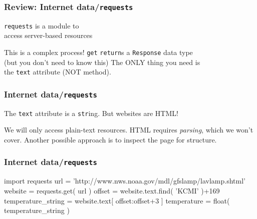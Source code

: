 \documentclass[11pt]{beamer}
\begin{document}
\begin{frame}[fragile]
  \frametitle{Review:  Internet data/\texttt{requests}}
  \Enlarge

  \begin{itemize}
  \myitem  \texttt{requests} is a module to \\ access server-based resources %
    \begin{itemize}
    \mysubitem  This is a complex process!
    \mysubitem  \texttt{get} \texttt{return}s a \texttt{Response} data type \\
    (but you don't need to know this) %
    \mysubitem  The ONLY thing you need is \\ the \texttt{text} attribute (NOT method).
    \end{itemize}
  \end{itemize}
\end{frame}

\begin{frame}[fragile]
  \frametitle{Internet data/\texttt{requests}}
  \Enlarge

  \begin{itemize}
  \myitem  The \texttt{text} attribute is a \texttt{str}ing. %
  \myitem  But websites are HTML! %
    \begin{itemize}
    \mysubitem  We will only access plain-text resources. %
    \mysubitem  HTML requires \emph{parsing}, which we won't cover. %
    \mysubitem  Another possible approach is to inspect the page for structure.
    \end{itemize}
  \end{itemize}
\end{frame}

\begin{frame}[fragile]
  \frametitle{Internet data/\texttt{requests}}

  \begin{semiverbatim}
import requests
url = 'http://www.nws.noaa.gov/mdl/gfslamp/lavlamp.shtml'
website = requests.get( url )
offset = website.text.find( 'KCMI' )+169
temperature_string = website.text[ offset:offset+3 ]
temperature = float( temperature_string )
  \end{semiverbatim}
\end{frame}
\end{document}
